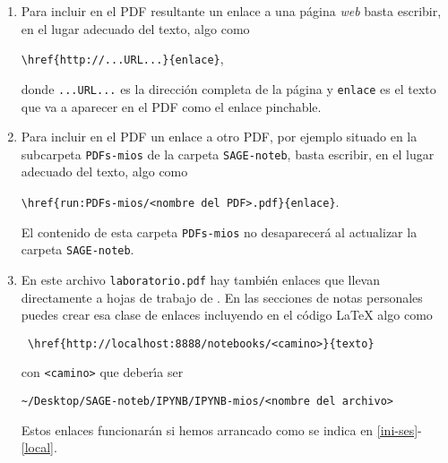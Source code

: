 \begin{appendices}
\begin{enumerate}
Si incluyes enlaces de estos en la copia de la carpeta \verb|SAGE-noteb| en el
ordenador del Laboratorio, y que lleven a zonas del PDF fuera de tus notas
personales, {\itshape esos enlaces desaparecer\'an cuando actualicemos} la
carpeta.


\item Para incluir en el PDF resultante un enlace a una p\'agina \emph{web}
basta escribir, en el lugar adecuado del texto, algo como 
\begin{center}
\verb|\href{http://...URL...}{enlace}|, 
\end{center}
\noindent donde \verb|...URL...| es la direcci\'on
completa de la p\'agina y \verb|enlace| es el texto que va a aparecer en el PDF
como el enlace pinchable.

\item Para incluir en el PDF un enlace a otro PDF, por ejemplo situado en la
subcarpeta \verb|PDFs-mios| de la carpeta \verb|SAGE-noteb|, basta escribir, en
el
lugar adecuado del texto, algo como 
\begin{center}
\verb|\href{run:PDFs-mios/<nombre del PDF>.pdf}{enlace}|.
\end{center}

El contenido de esta carpeta \verb|PDFs-mios| no desaparecer\'a al actualizar
la carpeta \verb|SAGE-noteb|.

\item En este archivo \verb|laboratorio.pdf| hay tambi\'en enlaces que llevan
directamente a hojas de trabajo de {\sage}. En las secciones de notas personales
puedes crear esa clase de enlaces incluyendo en el c\'odigo {\LaTeX} algo como 
 \small
 \begin{center}
 \begin{verbatim}
 \href{http://localhost:8888/notebooks/<camino>}{texto}
 \end{verbatim}
 \end{center}
 \normalsize
 
 \noindent con \verb=<camino>= que deber\'{\i}a ser 
 \begin{center}
 \verb=~/Desktop/SAGE-noteb/IPYNB/IPYNB-mios/<nombre del archivo>=
 \end{center}
 
Estos enlaces  funcionar\'an si hemos arrancado {\sage} como se indica en \ref{ini-ses}-\ref{local}.



\end{enumerate}




\end{appendices}








